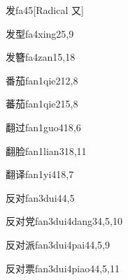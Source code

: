 \begin{verbete}{发}{fa4}{5}[Radical ⼜]
\end{verbete}

\begin{verbete}{发型}{fa4xing2}{5,9}
\end{verbete}

\begin{verbete}{发簪}{fa4zan1}{5,18}
\end{verbete}

\begin{verbete}{番茄}{fan1qie2}{12,8}
\end{verbete}

\begin{verbete}{蕃茄}{fan1qie2}{15,8}
\end{verbete}

\begin{verbete}{翻过}{fan1guo4}{18,6}
\end{verbete}

\begin{verbete}{翻脸}{fan1lian3}{18,11}
\end{verbete}

\begin{verbete}{翻译}{fan1yi4}{18,7}
\end{verbete}

\begin{verbete}{反对}{fan3dui4}{4,5}
\end{verbete}

\begin{verbete}{反对党}{fan3dui4dang3}{4,5,10}
\end{verbete}

\begin{verbete}{反对派}{fan3dui4pai4}{4,5,9}
\end{verbete}

\begin{verbete}{反对票}{fan3dui4piao4}{4,5,11}
\end{verbete}

